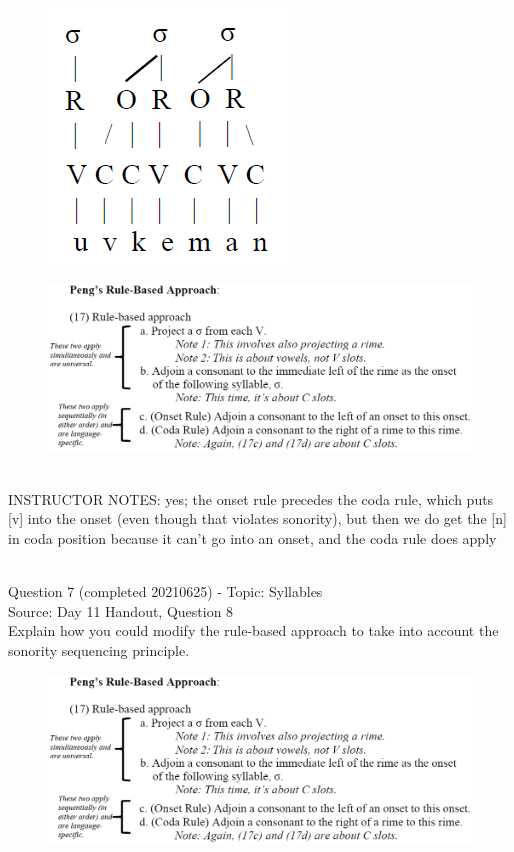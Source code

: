 \documentclass[12pt]{article}
\begin{document}
\begin{figure}[H]
\includegraphics{../images/pengrules_uvkeman_yes.png}
\end{figure}
\begin{figure}[H]
\includegraphics{../images/peng_rules.png}
\end{figure}

~\\
INSTRUCTOR NOTES: yes; the onset rule precedes the coda rule, which puts [v] into the onset (even though that violates sonority), but then we do get the [n] in coda position because it can't go into an onset, and the coda rule does apply


~\\

{\large Question 7} (completed 20210625) - Topic: Syllables\\
Source: Day 11 Handout, Question 8\\

Explain how you could modify the rule-based approach to take into account the sonority sequencing principle.\\

\begin{figure}[H]
\includegraphics{../images/peng_rules.png}
\end{figure}
\end{document}
